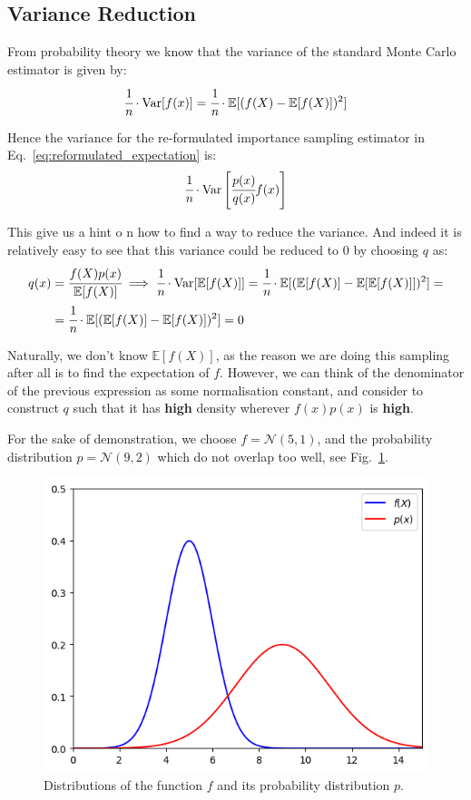 \documentclass[12pt,a4paper]{book}
\begin{document}
\subsection{Variance Reduction}
From probability theory we know that the variance of the standard Monte Carlo estimator is given by:
\begin{equation}
\cfrac{1}{n}\cdot\text{Var}[f(x)] = \cfrac{1}{n}\cdot\mathbb{E}[(f(X)-\mathbb{E}[f(X)])^2]
\end{equation}

Hence the variance for the re-formulated importance sampling estimator in Eq.~\ref{eq:reformulated_expectation} is:
\begin{equation}
\cfrac{1}{n}\cdot\text{Var}\left[\cfrac{p(x)}{q(x)}f(x)\right]
\end{equation}

This give us a hint o	n how to find a way to reduce the variance. And indeed it is relatively easy to see that this variance could be reduced to 0 by choosing $q$ as:
\begin{equation}
\begin{aligned}
q(x)&=\cfrac{f(X)p(x)}{\mathbb{E}[f(X)]} \implies \cfrac{1}{n}\cdot\text{Var}[\mathbb{E}[f(X)]] = \cfrac{1}{n}\cdot\mathbb{E}[(\mathbb{E}[f(X)]-\mathbb{E}[\mathbb{E}[f(X)]])^2]=\\
&=\cfrac{1}{n}\cdot\mathbb{E}[(\mathbb{E}[f(X)]-\mathbb{E}[f(X)])^2] = 0
\end{aligned}
\end{equation}

Naturally, we don’t know $\mathbb{E}[f(X)]$, as the reason we are doing this sampling after all is to find the expectation of $f$.
However, we can think of the denominator of the previous expression as some normalisation constant, and consider to construct $q$ such that it has \textbf{high} density wherever $f(x)p(x)$ is \textbf{high}.

For the sake of demonstration, we choose $f=\mathcal{N}(5, 1)$, and the probability distribution $p=\mathcal{N}(9,2)$ which do not overlap too well, see Fig.~\ref{fig:f_and_p}.
\begin{figure}[htbp]
\begin{center}
\includegraphics[width=0.5\linewidth]{addons/f_and_p}
\end{center}
\caption{Distributions of the function $f$ and its probability distribution $p$.}
\label{fig:f_and_p}
\end{figure}
\end{document}
